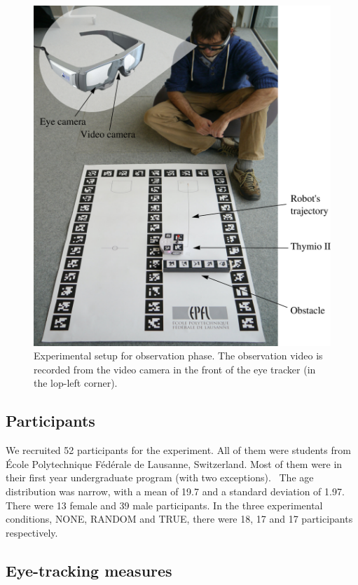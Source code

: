 \documentclass{sig-alternate}
\begin{document}
\begin{figure}
    \centering
    \includegraphics[width=0.9\linewidth]{setup}
    \caption{\small Experimental setup for observation phase. The observation
    video is recorded from the video camera in the front of the eye tracker (in
    the lop-left corner).}

    \label{expe}
\end{figure}


\vspace{1cm}
\subsection{Participants}

We recruited 52 participants for the experiment. All of them were
students from École Polytechnique Fédérale de Lausanne, Switzerland.
Most of them were in their first year undergraduate program (with two
exceptions). ~The age distribution was narrow, with a mean of 19.7 and a
standard deviation of 1.97. There were 13 female and 39 male
participants. In the three experimental conditions, {\sf NONE}, {\sf RANDOM} and
{\sf TRUE}, there were 18, 17 and 17 participants respectively.

\subsection{Eye-tracking measures}
\end{document}
